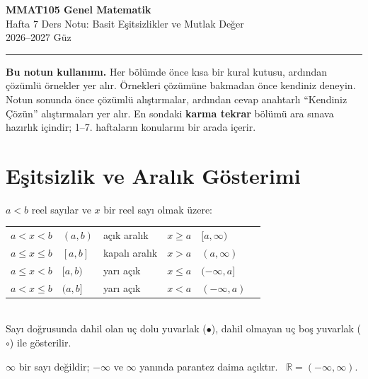 \documentclass[11pt,a4paper]{article}
\begin{document}
\begin{minipage}[c]{\textwidth}
{\LARGE\bfseries\color{anamavi} MMAT105 Genel Matematik}\\[4pt]
{\large Hafta 7 Ders Notu: Basit Eşitsizlikler ve Mutlak Değer}\\[6pt]
{\small 2026--2027 Güz}
\end{minipage}

\vspace{4pt}\noindent\textcolor{anamavi}{\rule{\textwidth}{1pt}}

\textbf{Bu notun kullanımı.} Her bölümde önce kısa bir kural kutusu, ardından çözümlü örnekler yer alır. Örnekleri çözümüne bakmadan önce kendiniz deneyin. Notun sonunda önce çözümlü alıştırmalar, ardından cevap anahtarlı ``Kendiniz Çözün'' alıştırmaları yer alır. En sondaki \textbf{karma tekrar} bölümü ara sınava hazırlık içindir; 1--7. haftaların konularını bir arada içerir.

\section{Eşitsizlik ve Aralık Gösterimi}

\begin{kural}
\(a<b\) reel sayılar ve \(x\) bir reel sayı olmak üzere:\\[2pt]
\renewcommand{\arraystretch}{1.25}
\begin{tabular}{@{}lll@{\qquad}lll@{}}
\(a<x<b\) & \((a,b)\) & açık aralık & \(x\ge a\) & \([a,\infty)\) & \\
\(a\le x\le b\) & \([a,b]\) & kapalı aralık & \(x>a\) & \((a,\infty)\) & \\
\(a\le x<b\) & \([a,b)\) & yarı açık & \(x\le a\) & \((-\infty,a]\) & \\
\(a<x\le b\) & \((a,b]\) & yarı açık & \(x<a\) & \((-\infty,a)\) &
\end{tabular}\\[2pt]
Sayı doğrusunda dahil olan uç dolu yuvarlak (\(\bullet\)), dahil olmayan uç boş yuvarlak (\(\circ\)) ile gösterilir.
\end{kural}

\begin{dikkat}
\(\infty\) bir sayı değildir; \(-\infty\) ve \(\infty\) yanında parantez daima açıktır. \ \(\mathbb{R}=(-\infty,\infty)\).
\end{dikkat}
\end{document}
